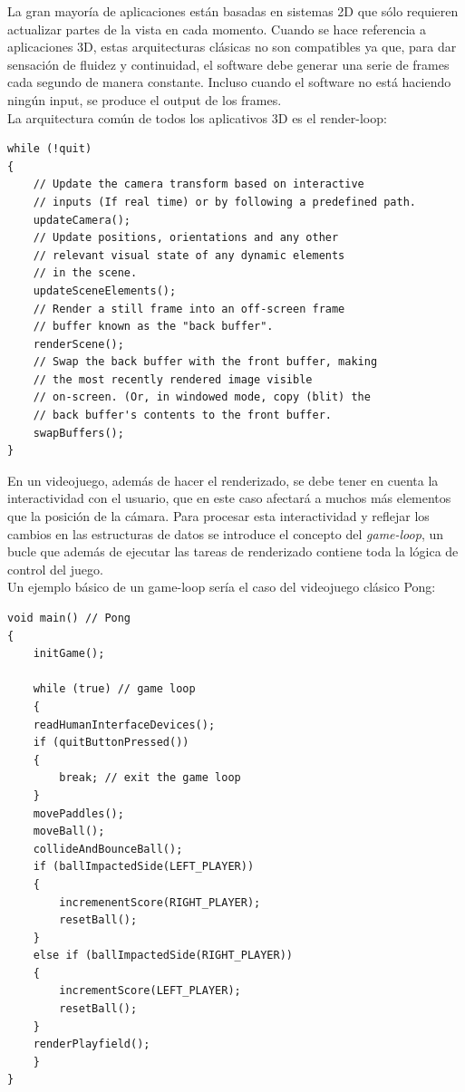 \documentclass[a4paper,12pt]{report}
\begin{document}
	La gran mayoría de aplicaciones están basadas en sistemas 2D que sólo requieren actualizar partes de la vista en cada momento. Cuando se hace referencia a aplicaciones 3D, estas arquitecturas clásicas no son compatibles ya que, para dar sensación de fluidez y continuidad, el software debe generar una serie de frames cada segundo de manera constante. Incluso cuando el software no está haciendo ningún input, se produce el output de los frames. \\
	
	La arquitectura común de todos los aplicativos 3D es el render-loop:
	
	\begin{lstlisting}[style=C, numbers=none]
while (!quit)
{
	// Update the camera transform based on interactive
	// inputs (If real time) or by following a predefined path.
	updateCamera();
	// Update positions, orientations and any other
	// relevant visual state of any dynamic elements
	// in the scene.
	updateSceneElements();
	// Render a still frame into an off-screen frame
	// buffer known as the "back buffer".
	renderScene();
	// Swap the back buffer with the front buffer, making
	// the most recently rendered image visible
	// on-screen. (Or, in windowed mode, copy (blit) the
	// back buffer's contents to the front buffer.
	swapBuffers();
}
\end{lstlisting}
	
	
	En un videojuego, además de hacer el renderizado, se debe tener en cuenta la interactividad con el usuario, que en este caso afectará a muchos más elementos que la posición de la cámara. Para procesar esta interactividad y reflejar los cambios en las estructuras de datos se introduce el concepto del \textit{game-loop}, un bucle que además de ejecutar las tareas de renderizado contiene toda la lógica de control del juego.\\
	
	 Un ejemplo básico de un game-loop sería el caso del videojuego clásico Pong:
	
		\begin{lstlisting}[style=C, numbers=none]
void main() // Pong
{
	initGame();
		
	while (true) // game loop
	{
	readHumanInterfaceDevices();
	if (quitButtonPressed())
	{
		break; // exit the game loop
	}
	movePaddles();
	moveBall();
	collideAndBounceBall();
	if (ballImpactedSide(LEFT_PLAYER))
	{
		incremenentScore(RIGHT_PLAYER);
		resetBall();
	}
	else if (ballImpactedSide(RIGHT_PLAYER))
	{
		incrementScore(LEFT_PLAYER);
		resetBall();
	}
	renderPlayfield();
	}
}
	\end{lstlisting}
	
\end{document}
